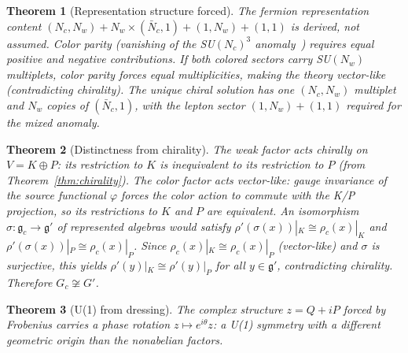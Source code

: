 \documentclass[12pt,a4paper]{article}
\newtheorem{theorem}{Theorem}
\begin{document}
\begin{theorem}[Representation structure forced]
\label{thm:rep_structure}
The fermion representation content $(N_c, N_w) + N_w \times (\bar{N}_c, 1) + (1, N_w) + (1, 1)$ is \emph{derived}, not assumed. Color parity (vanishing of the SU$(N_c)^3$ anomaly~\cite{adler,belljackiw}) requires equal positive and negative contributions. If both colored sectors carry SU$(N_w)$ multiplets, color parity forces equal multiplicities, making the theory vector-like (contradicting chirality). The unique chiral solution has one $(N_c, N_w)$ multiplet and $N_w$ copies of $(\bar{N}_c, 1)$, with the lepton sector $(1, N_w) + (1, 1)$ required for the mixed anomaly.
\end{theorem}

\begin{theorem}[Distinctness from chirality]
\label{thm:distinctness}
The weak factor acts \emph{chirally} on $V = K \oplus P$: its restriction to $K$ is inequivalent to its restriction to $P$ (from Theorem~\ref{thm:chirality}). The color factor acts \emph{vector-like}: gauge invariance of the source functional $\varphi$ forces the color action to commute with the K/P projection, so its restrictions to $K$ and $P$ are equivalent. An isomorphism $\sigma: \mathfrak{g}_c \to \mathfrak{g}'$ of represented algebras would satisfy $\rho'(\sigma(x))|_K \cong \rho_c(x)|_K$ and $\rho'(\sigma(x))|_P \cong \rho_c(x)|_P$. Since $\rho_c(x)|_K \cong \rho_c(x)|_P$ (vector-like) and $\sigma$ is surjective, this yields $\rho'(y)|_K \cong \rho'(y)|_P$ for all $y \in \mathfrak{g}'$, contradicting chirality. Therefore $G_c \not\cong G'$.
\end{theorem}

\begin{theorem}[U(1) from dressing]
\label{thm:u1}
The complex structure $z = Q + iP$ forced by Frobenius carries a phase rotation $z \mapsto e^{i\theta}z$: a U(1) symmetry with a different geometric origin than the nonabelian factors.
\end{theorem}
\end{document}
